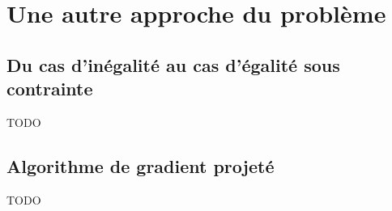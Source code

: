 \documentclass[10pt,a4paper]{article}
\begin{document}
\section{Une autre approche du problème}

\subsection{Du cas d'inégalité au cas d'égalité sous contrainte}
TODO

\subsection{Algorithme de gradient projeté}
TODO
\end{document}

